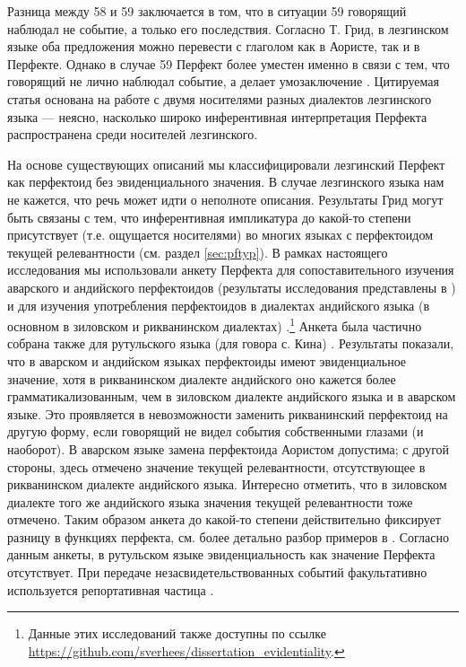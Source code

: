Разница между 58 и 59 заключается в том, что в ситуации 59 говорящий наблюдал не событие, а только его последствия. Согласно Т. Грид, в лезгинском языке оба предложения можно перевести с глаголом как в Аористе, так и в Перфекте. Однако в случае 59 Перфект более уместен именно в связи с тем, что говорящий не лично наблюдал событие, а делает умозаключение \citep[16--17]{greed2017}. Цитируемая статья основана на работе с двумя носителями разных диалектов лезгинского языка --- неясно, насколько широко инферентивная интерпретация Перфекта распространена среди носителей лезгинского. 
\par На основе существующих описаний мы классифицировали лезгинский Перфект как перфектоид без эвиденциального значения. В случае лезгинского языка нам не кажется, что речь может идти о неполноте описания. Результаты Грид могут быть связаны с тем, что инферентивная импликатура до какой-то степени присутствует (т.е. ощущается носителями) во многих языках с перфектоидом текущей релевантности (см. раздел \ref{sec:pftyp}). В рамках настоящего исследования мы использовали анкету Перфекта для сопоставительного изучения аварского и андийского перфектоидов (результаты исследования представлены в \citep{verhees2018}) и для изучения употребления перфектоидов в диалектах андийского языка (в основном в зиловском и рикванинском диалектах) \citep{verhees2017}.\footnote{Данные этих исследований также доступны по ссылке \url{https://github.com/sverhees/dissertation_evidentiality}.} Анкета была частично собрана также для рутульского языка (для говора с. Кина) \citep{verhees2017}. Результаты показали, что в аварском и андийском языках перфектоиды имеют эвиденциальное значение, хотя в рикванинском диалекте андийского оно кажется более грамматикализованным, чем в зиловском диалекте андийского языка и в аварском языке. Это проявляется в невозможности заменить рикванинский перфектоид на другую форму, если говорящий не видел события собственными глазами (и наоборот). В аварском языке замена перфектоида Аористом допустима; с другой стороны, здесь отмечено значение текущей релевантности, отсутствующее в рикванинском диалекте андийского языка. Интересно отметить, что в зиловском диалекте того же андийского языка значения текущей релевантности тоже отмечено. Таким образом анкета до какой-то степени действительно фиксирует разницу в функциях перфекта, см. более детально разбор примеров в \citep{verhees2018}. Согласно данным анкеты, в рутульском языке эвиденциальность как значение Перфекта отсутствует. При передаче незасвидетельствованных событий факультативно используется репортативная частица \citep{verhees2017}. 
